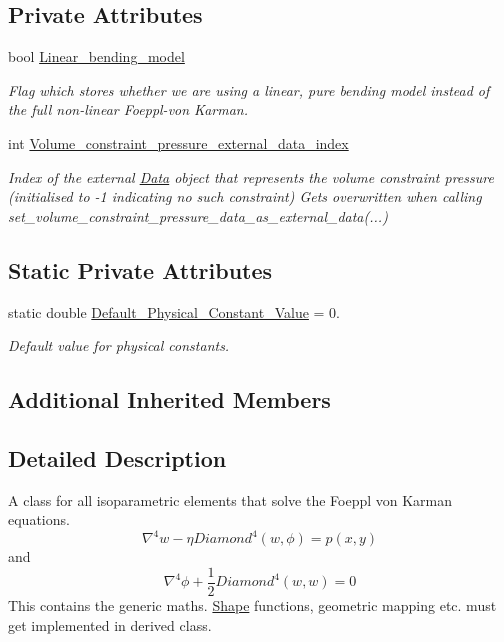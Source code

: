 \subsection*{Private Attributes}
\begin{DoxyCompactItemize}
\item 
bool \hyperlink{classoomph_1_1FoepplvonKarmanEquations_a72d0569b3d2ee26df59309e941c6283a}{Linear\+\_\+bending\+\_\+model}
\begin{DoxyCompactList}\small\item\em Flag which stores whether we are using a linear, pure bending model instead of the full non-\/linear Foeppl-\/von Karman. \end{DoxyCompactList}\item 
int \hyperlink{classoomph_1_1FoepplvonKarmanEquations_a649df9e5e9f5717be0c34c017875e352}{Volume\+\_\+constraint\+\_\+pressure\+\_\+external\+\_\+data\+\_\+index}
\begin{DoxyCompactList}\small\item\em Index of the external \hyperlink{classoomph_1_1Data}{Data} object that represents the volume constraint pressure (initialised to -\/1 indicating no such constraint) Gets overwritten when calling set\+\_\+volume\+\_\+constraint\+\_\+pressure\+\_\+data\+\_\+as\+\_\+external\+\_\+data(...) \end{DoxyCompactList}\end{DoxyCompactItemize}
\subsection*{Static Private Attributes}
\begin{DoxyCompactItemize}
\item 
static double \hyperlink{classoomph_1_1FoepplvonKarmanEquations_ac7346e43c4830c13d1320773d6608def}{Default\+\_\+\+Physical\+\_\+\+Constant\+\_\+\+Value} = 0.
\begin{DoxyCompactList}\small\item\em Default value for physical constants. \end{DoxyCompactList}\end{DoxyCompactItemize}
\subsection*{Additional Inherited Members}


\subsection{Detailed Description}
A class for all isoparametric elements that solve the Foeppl von Karman equations. \[ \nabla^4 w - \eta Diamond^4(w,\phi) = p(x,y) \] and \[ \nabla^4 \phi + \frac{1}{2} Diamond^4(w,w) = 0 \] This contains the generic maths. \hyperlink{classoomph_1_1Shape}{Shape} functions, geometric mapping etc. must get implemented in derived class. 

